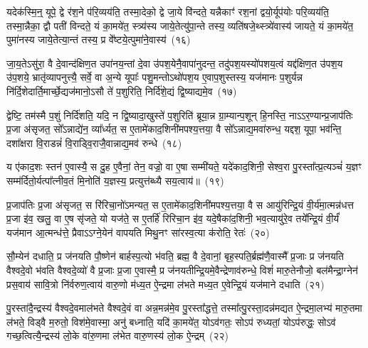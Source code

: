 यदेक॑स्मि॒न्॒ यूपे॒ द्वे र॑श॒ने प॑रि॒व्यय॑ति॒ तस्मा॒देको॒ द्वे जा॒ये वि॑न्दते॒ यन्नैकाꣳ॑ रश॒नां द्वयो॒र्यूप॑योः परि॒व्यय॑ति॒ तस्मा॒न्नैका॒ द्वौ पती॑ विन्दते॒ यं का॒मये॑त॒ स्त्र्य॑स्य जाये॒तेत्यु॑पा॒न्ते तस्य॒ व्यति॑षजे॒थ्स्त्र्ये॑वास्य॑ जायते॒ यं का॒मये॑त॒ पुमा॑नस्य जाये॒तेत्या॒न्तं तस्य॒ प्र वे᳚ष्टये॒त्पुमा॑ने॒वास्य॑~(१६)\ip

जा॒य॒ते\-ऽसु॑रा॒ वै दे॒वान्द॑क्षिण॒त उपा॑नय॒न्तां दे॒वा उ॑पश॒येनै॒वापा॑नुदन्त॒ तदु॑पश॒यस्यो॑पशय॒त्वं यद्द॑क्षिण॒त उ॑पश॒य उ॑प॒शये॒ भ्रातृ॑व्यापनुत्त्यै॒ सर्वे॒ वा अ॒न्ये यूपाः᳚ पशु॒मन्तो\-ऽथो॑पश॒य ए॒वाप॒शुस्तस्य॒ यज॑मानः प॒शुर्यन्न नि॑र्दि॒शेदार्ति॒\-मार्च्छे॒द्यज॑मानो॒\-ऽसौ ते॑ प॒शुरिति॒ निर्दि॑शे॒द्यं द्वि॒ष्याद्यमे॒व~(१७)\ip

द्वेष्टि॒ तम॑स्मै प॒शुं निर्दि॑शति॒ यदि॒ न द्वि॒ष्यादा॒खुस्ते॑ प॒शुरिति॑ ब्रूया॒न्न ग्रा॒म्यान्प॒शून् हि॒नस्ति॒ ना\-ऽऽर॒ण्यान्प्र॒जा\-प॑तिः प्र॒जा अ॑सृजत॒ सो᳚\-ऽन्नाद्ये॑न॒ व्या᳚र्ध्यत॒ स ए॒तामे॑काद॒शिनी॑मपश्य॒त्तया॒ वै सो᳚\-ऽन्नाद्य॒मवा॑रुन्ध॒ यद्दश॒ यूपा॒ भव॑न्ति॒ दशा᳚क्षरा वि॒राडन्नं॑ वि॒राड्वि॒राजै॒वान्नाद्य॒मव॑ रुन्धे~(१८)\ip

य ए॑काद॒शः स्तन॑ ए॒वास्यै॒ स दु॒ह ए॒वैनां॒ तेन॒ वज्रो॒ वा ए॒षा सम्मी॑यते॒ यदे॑काद॒शिनी॒ सेश्व॒रा पु॒रस्ता᳚त्प्र॒त्यञ्चं॑ य॒ज्ञꣳ सम्म॑र्दितो॒र्यत्पा᳚त्नीव॒तं मि॒नोति॑ य॒ज्ञस्य॒ प्रत्युत्त॑ब्ध्यै सय॒त्वाय॑॥~(१९)\ip

{\anuvakamend[{वै सम॑ष्ट्यै॒ पुमा॑ने॒वास्य॒ यमे॒व रु॑न्धे त्रि॒ꣳ॒शच्च॑}]}

प्र॒जा\-प॑तिः प्र॒जा अ॑सृजत॒ स रि॑रिचा॒नो॑\-ऽमन्यत॒ स ए॒तामे॑काद॒शिनी॑मपश्य॒त्तया॒ वै स आयु॑रिन्द्रि॒यं वी॒र्य॑मा॒त्मन्न॑धत्त प्र॒जा इ॑व॒ खलु॒ वा ए॒ष सृ॑जते॒ यो यज॑ते॒ स ए॒तर्\mbox{}हि॑ रिरिचा॒न इ॑व॒ यदे॒षैका॑द॒शिनी॒ भव॒त्यायु॑रे॒व तये᳚न्द्रि॒यं वी॒र्यं॑ यज॑मान आ॒त्मन्ध॑त्ते॒ प्रैवा\-ऽऽ\-ग्ने॒येन॑ वापयति मिथु॒नꣳ सा॑रस्व॒त्या क॑रोति॒ रेतः॑~(२०)\ip

सौ॒म्येन॑ दधाति॒ प्र ज॑नयति पौ॒ष्णेन॑ बार्\mbox{}हस्प॒त्यो भ॑वति॒ ब्रह्म॒ वै दे॒वानां॒ बृह॒स्पति॒र्ब्रह्म॑णै॒वास्मै᳚ प्र॒जाः प्र ज॑नयति वैश्वदे॒वो भ॑वति वैश्वदे॒व्यो॑ वै प्र॒जाः प्र॒जा ए॒वास्मै॒ प्र ज॑नयतीन्द्रि॒यमे॒वैन्द्रेणाव॑रुन्धे॒ विशं॑ मारु॒तेनौजो॒ बल॑मैन्द्रा॒ग्नेन॑ प्रस॒वाय॑ सावि॒त्रो नि॑र्वरुण॒त्वाय॑ वारु॒णो म॑ध्य॒त ऐ॒न्द्रमा ल॑भते मध्य॒त ए॒वेन्द्रि॒यं यज॑माने दधाति~(२१)\ip

पु॒रस्ता॑दै॒न्द्रस्य॑ वैश्वदे॒वमाल॑भते वैश्वदे॒वं वा अन्न॒मन्न॑मे॒व पु॒रस्ता᳚द्धत्ते॒ तस्मा᳚त्पु॒रस्ता॒दन्न॑मद्यत ऐ॒न्द्रमा॒लभ्य॑ मारु॒तमा ल॑भते॒ विड्वै म॒रुतो॒ विश॑मे॒वास्मा॒ अनु॑ बध्नाति॒ यदि॑ का॒मये॑त॒ यो\-ऽव॑गतः॒ सो\-ऽप॑ रुध्यतां॒ यो\-ऽप॑रुद्धः॒ सो\-ऽव॑ गच्छ॒त्वित्यै॒न्द्रस्य॑ लो॒के वा॑रु॒णमा ल॑भेत वारु॒णस्य॑ लो॒क ऐ॒न्द्रम्~(२२)\ip

